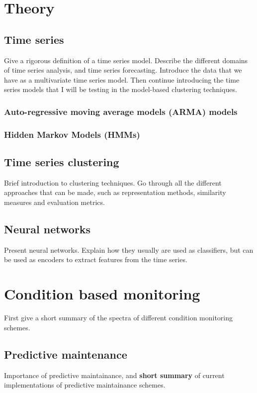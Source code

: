 \documentclass[12pt,english,a4paper,openright]{article}
\begin{document}
\section{Theory}

\subsection{Time series}
Give a rigorous definition of a time series model. Describe the different domains of time series analysis, and time series forecasting. Introduce the data that we have as a multivariate time series model. Then continue introducing the time series models that I will be testing in the model-based clustering techniques.

\subsubsection{Auto-regressive moving average models (ARMA) models}

\subsubsection{Hidden Markov Models (HMMs)}

\subsection{Time series clustering}
Brief introduction to clustering techniques. Go through all the different approaches that can be made, such as representation methods, similarity measures and evaluation metrics.

\subsection{Neural networks}
Present neural networks. Explain how they usually are used as classifiers, but can be used as encoders to extract features from the time series. 

\section{Condition based monitoring}
First give a short summary of the spectra of different condition monitoring schemes.

\subsection{Predictive maintenance}
Importance of predictive maintainance, and \textbf{short summary} of current implementations of predictive maintainance schemes. 
\end{document}
